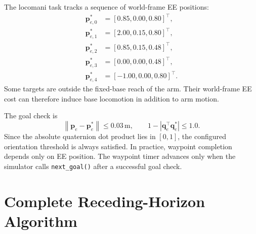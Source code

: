 \documentclass[11pt,a4paper]{article}
\newcommand{\norm}[1]{\left\lVert #1 \right\rVert}
\newcommand{\code}[1]{\texttt{#1}}
\begin{document}
The locomani task tracks a sequence of world-frame EE positions:
\begin{equation}
\begin{split}
  \bm{p}_{e,0}^{*}&=[0.85,0.00,0.80]^\top,\\
  \bm{p}_{e,1}^{*}&=[2.00,0.15,0.80]^\top,\\
  \bm{p}_{e,2}^{*}&=[0.85,0.15,0.48]^\top,\\
  \bm{p}_{e,3}^{*}&=[0.00,0.00,0.48]^\top,\\
  \bm{p}_{e,4}^{*}&=[-1.00,0.00,0.80]^\top.
\end{split}
\end{equation}
Some targets are outside the fixed-base reach of the arm. Their world-frame
EE cost can therefore induce base locomotion in addition to arm motion.

The goal check is
\begin{equation}
  \norm{\bm{p}_e-\bm{p}_e^*}\leq0.03\,\mathrm{m},
  \qquad
  1-\left|\bm{q}_e^\top\bm{q}_e^*\right|\leq1.0.
\end{equation}
Since the absolute quaternion dot product lies in $[0,1]$, the configured
orientation threshold is always satisfied. In practice, waypoint completion
depends only on EE position. The waypoint timer advances only when the
simulator calls \code{next\_goal()} after a successful goal check.


\section{Complete Receding-Horizon Algorithm}
\end{document}
